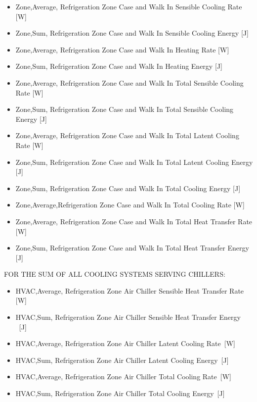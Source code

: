 \begin{itemize}
\item
  Zone,Average, Refrigeration Zone Case and Walk In Sensible Cooling Rate {[}W{]}
\item
  Zone,Sum, Refrigeration Zone Case and Walk In Sensible Cooling Energy {[}J{]}
\item
  Zone,Average, Refrigeration Zone Case and Walk In Heating Rate {[}W{]}
\item
  Zone,Sum, Refrigeration Zone Case and Walk In Heating Energy {[}J{]}
\item
  Zone,Average, Refrigeration Zone Case and Walk In Total Sensible Cooling Rate {[}W{]}
\item
  Zone,Sum, Refrigeration Zone Case and Walk In Total Sensible Cooling Energy {[}J{]}
\item
  Zone,Average, Refrigeration Zone Case and Walk In Total Latent Cooling Rate {[}W{]}
\item
  Zone,Sum, Refrigeration Zone Case and Walk In Total Latent Cooling Energy {[}J{]}
\item
  Zone,Sum, Refrigeration Zone Case and Walk In Total Cooling Energy {[}J{]}
\item
  Zone,Average,Refrigeration Zone Case and Walk In Total Cooling Rate {[}W{]}
\item
  Zone,Average, Refrigeration Zone Case and Walk In Total Heat Transfer Rate {[}W{]}
\item
  Zone,Sum, Refrigeration Zone Case and Walk In Total Heat Transfer Energy {[}J{]}
\end{itemize}

FOR THE SUM OF ALL COOLING SYSTEMS SERVING CHILLERS:

\begin{itemize}
\item
  HVAC,Average, Refrigeration Zone Air Chiller Sensible Heat Transfer Rate {[}W{]}
\item
  HVAC,Sum, Refrigeration Zone Air Chiller Sensible Heat Transfer Energy ~{[}J{]}
\item
  HVAC,Average, Refrigeration Zone Air Chiller Latent Cooling Rate~{[}W{]}
\item
  HVAC,Sum, Refrigeration Zone Air Chiller Latent Cooling Energy~{[}J{]}
\item
  HVAC,Average, Refrigeration Zone Air Chiller Total Cooling Rate~{[}W{]}
\item
  HVAC,Sum, Refrigeration Zone Air Chiller Total Cooling Energy~{[}J{]}
\end{itemize}

